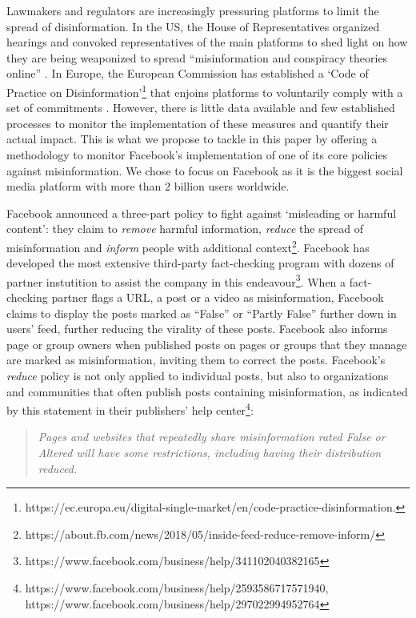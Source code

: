 \documentclass[11pt,a4paper]{article}
\begin{document}
Lawmakers and regulators are increasingly pressuring platforms to limit the spread of disinformation. In the US, the House of Representatives organized hearings and convoked representatives of the main platforms to shed light on how they are being weaponized to spread ``misinformation and conspiracy theories online'' \citep{donovan2020}. In Europe, the European Commission has established a `Code of Practice on Disinformation'\footnote{https://ec.europa.eu/digital-single-market/en/code-practice-disinformation.} that enjoins platforms to voluntarily comply with a set of commitments \citep{heldt2019let}. However, there is little data available and few established processes to monitor the implementation of these measures and quantify their actual impact. This is what we propose to tackle in this paper by offering a methodology to monitor Facebook’s implementation of one of its core policies against misinformation. We chose to focus on Facebook as it is the biggest social media platform with more than 2 billion users worldwide.

Facebook announced a three-part policy to fight against ‘misleading or harmful content’: they claim to \textit{remove} harmful information, \textit{reduce} the spread of misinformation and \textit{inform} people with additional context\footnote{https://about.fb.com/news/2018/05/inside-feed-reduce-remove-inform/}. Facebook has developed the most extensive third-party fact-checking program with dozens of partner instutition to assist the company in this endeavour\footnote{https://www.facebook.com/business/help/341102040382165}. When a fact-checking partner flags a URL, a post or a video as misinformation, Facebook claims to display the posts marked as “False” or “Partly False” further down in users’ feed, further reducing the virality of these posts. Facebook also informs page or group owners when published posts on pages or groups that they manage are marked as misinformation, inviting them to correct the posts. Facebook’s \textit{reduce} policy is not only applied to individual posts, but also to organizations and communities that often publish posts containing misinformation, as indicated by this statement in their publishers’ help center\footnote{https://www.facebook.com/business/help/2593586717571940, https://www.facebook.com/business/help/297022994952764}: 
\begin{quote}
\emph{Pages and websites that repeatedly share misinformation rated False or Altered will have some restrictions, including having their distribution reduced.}
\end{quote}
\end{document}
